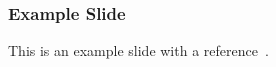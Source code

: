 

\begin{frame}
	\frametitle{Example Slide}
	This is an example slide with a reference~\cite{HeZeZuKrKo-FGMLN2020-Prediction-of-Mobile-Network-Connectivity}.
\end{frame}